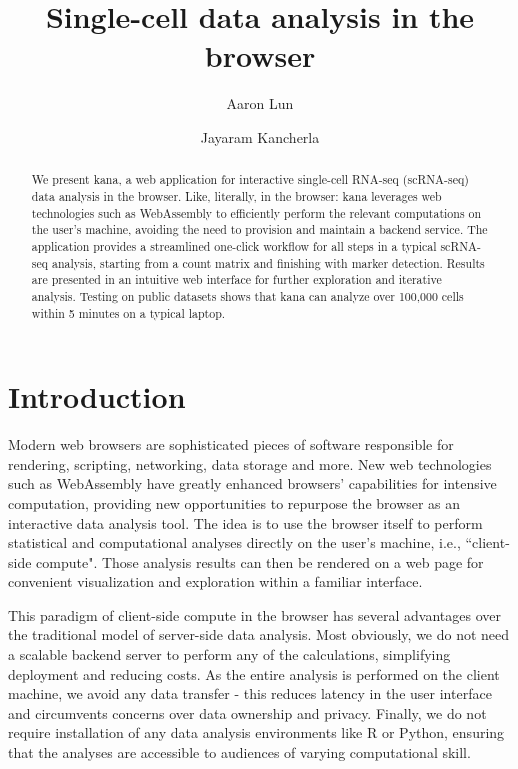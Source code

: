 \documentclass{article}
\title{Single-cell data analysis in the browser}
\author[1]{Aaron Lun}
\affil[1]{Genentech, Inc. South San Francisco, CA}
\author[1]{Jayaram Kancherla}
\begin{document}
\maketitle

\newcommand{\jay}[1]{\textcolor{red}{#1}}

\begin{abstract}
We present kana, a web application for interactive single-cell RNA-seq (scRNA-seq) data analysis in the browser.
Like, literally, in the browser:
kana leverages web technologies such as WebAssembly to efficiently perform the relevant computations on the user's machine,
avoiding the need to provision and maintain a backend service. 
The application provides a streamlined one-click workflow for all steps in a typical scRNA-seq analysis, 
starting from a count matrix and finishing with marker detection.
Results are presented in an intuitive web interface for further exploration and iterative analysis. 
Testing on public datasets shows that kana can analyze over 100,000 cells within 5 minutes on a typical laptop.
\end{abstract}

\section{Introduction}

Modern web browsers are sophisticated pieces of software responsible for rendering, scripting, networking, data storage and more.
New web technologies such as WebAssembly \cite{haas2017bringing} have greatly enhanced browsers' capabilities for intensive computation,
providing new opportunities to repurpose the browser as an interactive data analysis tool.
The idea is to use the browser itself to perform statistical and computational analyses directly on the user's machine, i.e., ``client-side compute". 
Those analysis results can then be rendered on a web page for convenient visualization and exploration within a familiar interface.

This paradigm of client-side compute in the browser has several advantages over the traditional model of server-side data analysis.
Most obviously, we do not need a scalable backend server to perform any of the calculations, simplifying deployment and reducing costs.
As the entire analysis is performed on the client machine, we avoid any data transfer - this reduces latency in the user interface and circumvents concerns over data ownership and privacy.
Finally, we do not require installation of any data analysis environments like R or Python, ensuring that the analyses are accessible to audiences of varying computational skill.
\end{document}
